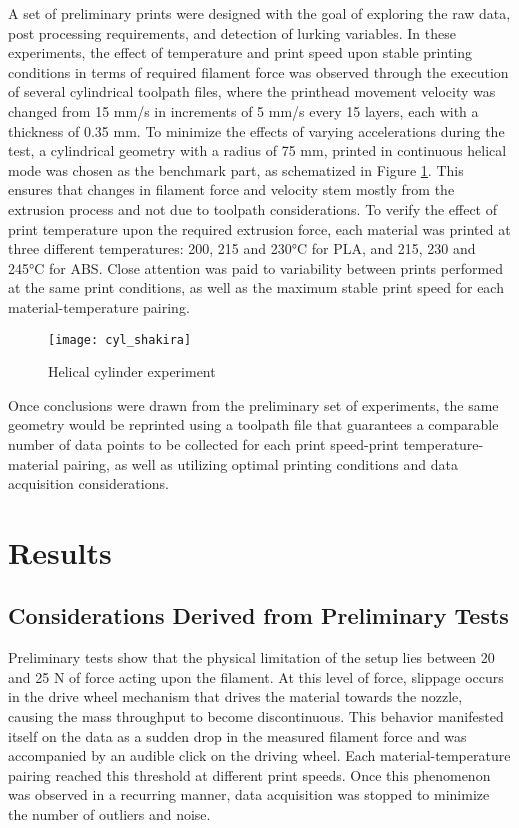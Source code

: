 \documentclass[main.tex]{subfiles}
\begin{document}
A set of preliminary prints were designed with the goal of exploring the raw data, post processing requirements, and detection of lurking variables. In these experiments, the effect of temperature and print speed upon stable printing conditions in terms of required filament force was observed through the execution of several cylindrical toolpath files, where the printhead movement velocity was changed from 15 mm/s in increments of 5 mm/s every 15 layers, each with a thickness of 0.35 mm. To minimize the effects of varying accelerations during the test, a cylindrical geometry with a radius of 75 mm, printed in continuous helical mode was chosen as the benchmark part, as schematized in Figure \ref{fig:cyl_shak}. This ensures that changes in filament force and velocity stem mostly from the extrusion process and not due to toolpath considerations. To verify the effect of print temperature upon the required extrusion force, each material was printed at three different temperatures: 200, 215 and 230°C for PLA, and 215, 230 and 245°C for ABS. Close attention was paid to variability between prints performed at the same print conditions, as well as the maximum stable print speed for each material-temperature pairing.

\begin{figure}[!htbp]
	\center
	\texttt{[image: cyl\_shakira]}
	\caption{Helical cylinder experiment} \label{fig:cyl_shak}
\end{figure}

Once conclusions were drawn from the preliminary set of experiments, the same geometry would be reprinted using a toolpath file that guarantees a comparable number of data points to be collected for each print speed-print temperature-material pairing, as well as utilizing optimal printing conditions and data acquisition considerations. 

\section{Results}
\subsection{Considerations Derived from Preliminary Tests}

Preliminary tests show that the physical limitation of the setup lies between 20 and 25 N of force acting upon the filament. At this level of force, slippage occurs in the drive wheel mechanism that drives the material towards the nozzle, causing the mass throughput to become discontinuous. This behavior manifested itself on the data as a sudden drop in the measured filament force and was accompanied by an audible click on the driving wheel. Each material-temperature pairing reached this threshold at different print speeds. Once this phenomenon was observed in a recurring manner, data acquisition was stopped to minimize the number of outliers and noise.
 
\end{document}
